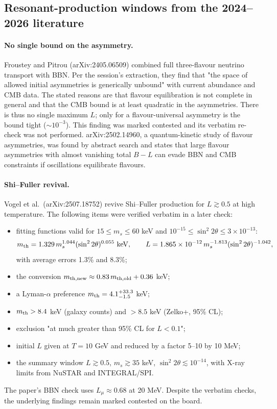 \documentclass[11pt,a4paper]{article}
\begin{document}
\subsection{Resonant-production windows from the 2024--2026 literature}

\paragraph{No single bound on the asymmetry.} Froustey and Pitrou (arXiv:2405.06509) combined full three-flavour neutrino transport with BBN. Per the session's extraction, they find that "the space of allowed initial asymmetries is generically unbound" with current abundance and CMB data. The stated reasons are that flavour equilibration is not complete in general and that the CMB bound is at least quadratic in the asymmetries. There is thus no single maximum $L$; only for a flavour-universal asymmetry is the bound tight ($\sim10^{-3}$). This finding was marked contested and its verbatim re-check was not performed. arXiv:2502.14960, a quantum-kinetic study of flavour asymmetries, was found by abstract search and states that large flavour asymmetries with almost vanishing total $B-L$ can evade BBN and CMB constraints if oscillations equilibrate flavours.

\paragraph{Shi--Fuller revival.} Vogel et al.\ (arXiv:2507.18752) revive Shi--Fuller production for $L\gtrsim0.5$ at high temperature. The following items were verified verbatim in a later check:
\begin{itemize}
\item fitting functions valid for $15\le m_s\le60$ keV and $10^{-15}\le\sin^2 2\theta\le3\times10^{-13}$:
\begin{equation}
m_{\rm th}=1.329\,m_s^{1.044}(\sin^2 2\theta)^{0.055}\ {\rm keV},\qquad L=1.865\times10^{-12}\,m_s^{-1.813}(\sin^2 2\theta)^{-1.042},
\end{equation}
with average errors 1.3\% and 8.3\%;
\item the conversion $m_{\rm th,new}\approx0.83\,m_{\rm th,old}+0.36$ keV;
\item a Lyman-$\alpha$ preference $m_{\rm th}=4.1^{+33.3}_{-1.5}$ keV;
\item $m_{\rm th}>8.4$ keV (galaxy counts) and $>8.5$ keV (Zelko+, 95\% CL);
\item exclusion "at much greater than 95\% CL for $L<0.1$";
\item initial $L$ given at $T=10$ GeV and reduced by a factor 5--10 by 10 MeV;
\item the summary window $L\gtrsim0.5$, $m_s\gtrsim35$ keV, $\sin^2 2\theta\lesssim10^{-14}$, with X-ray limits from NuSTAR and INTEGRAL/SPI.
\end{itemize}
The paper's BBN check uses $L_\mu\approx0.68$ at 20 MeV. Despite the verbatim checks, the underlying findings remain marked contested on the board.
\end{document}
